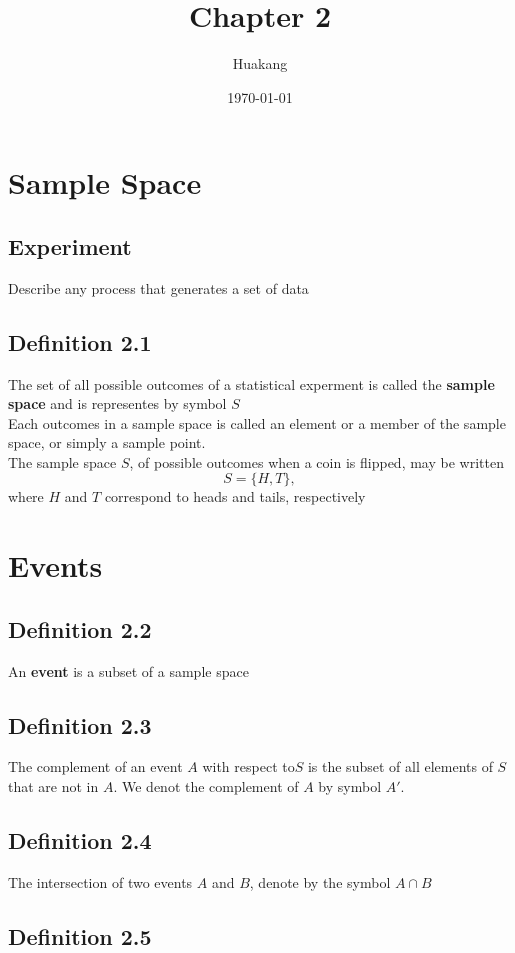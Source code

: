\documentclass{article}
\title{Chapter 2}
\date{\today}
\author{Huakang}
\begin{document}
\maketitle
\section{Sample Space}
\subsection{Experiment}
Describe any process that generates a set of data
\subsection{Definition 2.1}

The set of all possible outcomes of a statistical experment is called the 
\textbf{sample space} and is representes by symbol $S$\\Each outcomes in a sample 
space is called an element or a member of the sample space, or simply a sample point.\\
The sample space $S$, of possible outcomes when a coin is flipped, may be written \\
$$ S=\{H,T\},$$
where $H$ and $T$ correspond to heads and tails, respectively
\section{Events}
\subsection{Definition 2.2}
An \textbf{event} is a subset of a sample space
\subsection{Definition 2.3}
The complement of an event $A$ with respect to$S$ is the subset of all elements of
 $S$ that are not in $A$. We denot the complement of $A$ by symbol $A'$.


\subsection{Definition 2.4}

The intersection of two events $A$ and $B$, denote by the symbol $A \cap B$

\subsection{Definition 2.5}
\end{document}
